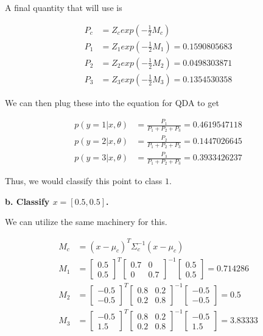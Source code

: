 {A final quantity that will use is

\begin{align}
    P_c & = Z_c exp(-\frac{1}{2}M_c) \\
    P_1 & = Z_1 exp(-\frac{1}{2}M_1) = 0.1590805683 \\
    P_2 & = Z_2 exp(-\frac{1}{2}M_2) = 0.0498303871 \\
    P_3 & = Z_3 exp(-\frac{1}{2}M_3) = 0.1354530358
\end{align}

We can then plug these into the equation for QDA to get

\begin{align}
    p(y=1|x,\theta) & = \frac{P_1}{P_1+P_2+P_3} = 0.4619547118 \\
    p(y=2|x,\theta) & = \frac{P_2}{P_1+P_2+P_3} = 0.1447026645 \\
    p(y=3|x,\theta) & = \frac{P_3}{P_1+P_2+P_3} = 0.3933426237
\end{align}

Thus, we would classify this point to class $1$.

\textbf{b. Classify $x = [0.5, 0.5]$.}

We can utilize the same machinery for this.

\begin{align}
    M_c & = (x-\mu_c)^T\Sigma_c^{-1}(x-\mu_c) \\
    M_1 & = \begin{bmatrix}0.5\\ 0.5\end{bmatrix}^T
            \begin{bmatrix}0.7 & 0\\ 0 & 0.7\end{bmatrix}^{-1}
            \begin{bmatrix}0.5\\ 0.5\end{bmatrix} = 0.714286 \\
    M_2 & = \begin{bmatrix}-0.5\\ -0.5\end{bmatrix}^T
            \begin{bmatrix}0.8 & 0.2\\ 0.2 & 0.8\end{bmatrix}^{-1}
            \begin{bmatrix}-0.5\\ -0.5\end{bmatrix} = 0.5 \\
    M_3 & = \begin{bmatrix}-0.5\\ 1.5\end{bmatrix}^T
            \begin{bmatrix}0.8 & 0.2\\ 0.2 & 0.8\end{bmatrix}^{-1}
            \begin{bmatrix}-0.5\\ 1.5\end{bmatrix} = 3.83333
\end{align}

}

